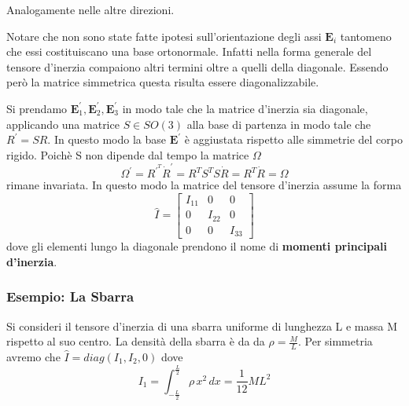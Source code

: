 \noindent Analogamente nelle altre direzioni.

\begin{remark}
	\noindent Notare che non sono state fatte ipotesi sull'orientazione degli assi $\bm{E}_{i}$ tantomeno che essi costituiscano una base ortonormale. Infatti nella forma generale del tensore d'inerzia compaiono altri termini oltre a quelli della diagonale. Essendo per\`{o} la matrice simmetrica questa risulta essere diagonalizzabile. 
\end{remark}

\noindent Si prendamo $\bm{E}_1^{\prime}, \bm{E}_2^{\prime}, \bm{E}_3^{\prime}$ in modo tale che la matrice d'inerzia sia diagonale, applicando una matrice $S \in SO(3)$ alla base di partenza in modo tale che $R^{\prime} = SR$. In questo modo la base $\bm{E}^{\prime}$ \`{e} aggiustata rispetto alle simmetrie del corpo rigido. Poich\`{e} S non dipende dal tempo la matrice $\Omega$ 
\begin{equation*}
	\Omega^{\prime} = R^{\prime^T} \dot{R}^{\prime} = R^TS^TS\dot{R} = R^T\dot{R} = \Omega
\end{equation*}
rimane invariata. In questo modo la matrice del tensore d'inerzia assume la forma 
\begin{equation}
\hat{I} =
\left[\begin{array}{ccc}
I_{11} & 0 & 0 \\
0 & I_{22} & 0 \\
0 & 0 & I_{33}
\end{array}\right]
\end{equation}
dove gli elementi lungo la diagonale prendono il nome di \textbf{momenti principali d'inerzia}.
\subsubsection{Esempio: La Sbarra}
Si consideri il tensore d'inerzia di una sbarra uniforme di lunghezza L e massa M rispetto al suo centro. La densit\`{a} della sbarra \`{e} da da $\rho = \frac{M}{L}$. Per simmetria avremo che $\hat{I} = diag(I_1,I_2,0)$ dove 
\begin{equation}
	I_1 = \int_{-\frac{L}{2}}^{\frac{L}{2}}\rho \, x^2 \,dx = \frac{1}{12}ML^2
\end{equation}
